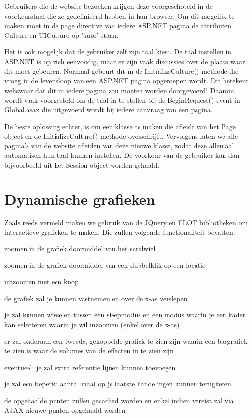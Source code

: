 Gebruikers die de website bezoeken krijgen deze voorgeschoteld in de voorkeurstaal die ze gedefinieerd hebben in hun browser. Om dit mogelijk te maken moet in de page directive van iedere ASP.NET pagina de attributen Culture en UICulture op 'auto' staan.

Het is ook mogelijk dat de gebruiker zelf zijn taal kiest. De taal instellen in ASP.NET is op zich eenvoudig, maar er zijn vaak discussies over de plaats waar dit moet gebeuren. Normaal gebeurt dit in de InitializeCulture()-methode die vroeg in de levensloop van een ASP.NET pagina opgeroepen wordt. Dit betekent weliswaar dat dit in iedere pagina zou moeten worden doorgevoerd! Daarom wordt vaak voorgesteld om de taal in te stellen bij de BeginRequest()-event in Global.asax die uitgevoerd wordt bij iedere aanvraag van een pagina.

De beste oplossing echter, is om een klasse te maken die afleidt van het Page object en de InitializeCulture()-methode overschrijft. Vervolgens laten we alle pagina's van de website afleiden van deze nieuwe klasse, zodat deze allemaal automatisch hun taal kunnen instellen. De voorkeur van de gebruiker kan dan bijvoorbeeld uit het Session-object worden gehaald.

%
%


\chapter{Dynamische grafieken}

Zoals reeds vermeld maken we gebruik van de JQuery en FLOT bibliotheken om interactieve grafieken te maken. Die zullen volgende functionaliteit bevatten:
\begin{itemize_compact}
\item{zoomen in de grafiek doormiddel van het scrolwiel}
\item{zoomen in de grafiek doormiddel van een dubbelklik op een locatie}
\item{uitzoomen met een knop}
\item{de grafiek zal je kunnen vastnemen en over de x-as verslepen}
\item{je zal kunnen wisselen tussen een sleepmodus en een modus waarin je een kader kan selecteren waarin je wil inzoomen (enkel over de x-as)}
\item{er zal onderaan een tweede, gekoppelde grafiek te zien zijn waarin een bargrafiek te zien is waar de volumes van de effecten in te zien zijn}
\item{eventueel: je zal extra referentie lijnen kunnen toevoegen}
\item{je zal een beperkt aantal maal op je laatste handelingen kunnen terugkeren}
\item{de opgehaalde punten zullen gecached worden en enkel indien vereist zal via AJAX nieuwe punten opgehaald worden}
\end{itemize_compact}


